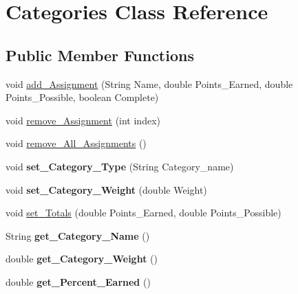 \hypertarget{class_categories}{\section{Categories Class Reference}
\label{class_categories}
}
\subsection*{Public Member Functions}
\begin{DoxyCompactItemize}
\item 
void \hyperlink{class_categories_a8d3a1d8c0e92d597ab14871ee109a327}{add\-\_\-\-Assignment} (String Name, double Points\-\_\-\-Earned, double Points\-\_\-\-Possible, boolean Complete)
\item 
void \hyperlink{class_categories_abebb00d8f24619086f2aec4dad976678}{remove\-\_\-\-Assignment} (int index)
\item 
void \hyperlink{class_categories_a4a5f4a06f7617c1db359a6e0792cf1de}{remove\-\_\-\-All\-\_\-\-Assignments} ()
\item 
\hypertarget{class_categories_a3c0c37573c975789bfdb08a78c99e292}{void {\bfseries set\-\_\-\-Category\-\_\-\-Type} (String Category\-\_\-name)}\label{class_categories_a3c0c37573c975789bfdb08a78c99e292}

\item 
\hypertarget{class_categories_a15a4c950bc4bcb00a97e40a8f96196e7}{void {\bfseries set\-\_\-\-Category\-\_\-\-Weight} (double Weight)}\label{class_categories_a15a4c950bc4bcb00a97e40a8f96196e7}

\item 
void \hyperlink{class_categories_aa765331d80b829970f464da4dd88ada3}{set\-\_\-\-Totals} (double Points\-\_\-\-Earned, double Points\-\_\-\-Possible)
\item 
\hypertarget{class_categories_ae245339197b51c434f2d04469c157569}{String {\bfseries get\-\_\-\-Category\-\_\-\-Name} ()}\label{class_categories_ae245339197b51c434f2d04469c157569}

\item 
\hypertarget{class_categories_a86ac0cb1651f30595edf85c72bc890a5}{double {\bfseries get\-\_\-\-Category\-\_\-\-Weight} ()}\label{class_categories_a86ac0cb1651f30595edf85c72bc890a5}

\item 
\hypertarget{class_categories_ad981e983f17cc095700120dee18b3d95}{double {\bfseries get\-\_\-\-Percent\-\_\-\-Earned} ()}\label{class_categories_ad981e983f17cc095700120dee18b3d95}

\end{DoxyCompactItemize}


